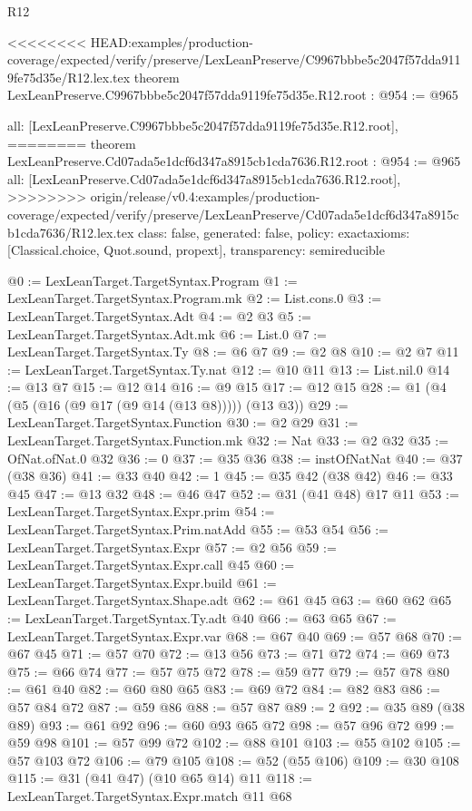 \begin{lexlean}{R12}
\begin{coremodule}
{{{{{{{{}
<<<<<<<< HEAD:examples/production-coverage/expected/verify/preserve/LexLeanPreserve/C9967bbbe5c2047f57dda9119fe75d35e/R12.lex.tex
theorem LexLeanPreserve.C9967bbbe5c2047f57dda9119fe75d35e.R12.root : @954 := @965 {
  all: [LexLeanPreserve.C9967bbbe5c2047f57dda9119fe75d35e.R12.root],
========
theorem LexLeanPreserve.Cd07ada5e1dcf6d347a8915cb1cda7636.R12.root : @954 := @965 {
  all: [LexLeanPreserve.Cd07ada5e1dcf6d347a8915cb1cda7636.R12.root],
>>>>>>>> origin/release/v0.4:examples/production-coverage/expected/verify/preserve/LexLeanPreserve/Cd07ada5e1dcf6d347a8915cb1cda7636/R12.lex.tex
  class: false,
  generated: false,
  policy: exact{axioms: [Classical.choice, Quot.sound, propext]},
  transparency: semireducible
}

@0 := LexLeanTarget.TargetSyntax.Program
@1 := LexLeanTarget.TargetSyntax.Program.mk
@2 := List.cons.{0}
@3 := LexLeanTarget.TargetSyntax.Adt
@4 := @2 @3
@5 := LexLeanTarget.TargetSyntax.Adt.mk
@6 := List.{0}
@7 := LexLeanTarget.TargetSyntax.Ty
@8 := @6 @7
@9 := @2 @8
@10 := @2 @7
@11 := LexLeanTarget.TargetSyntax.Ty.nat
@12 := @10 @11
@13 := List.nil.{0}
@14 := @13 @7
@15 := @12 @14
@16 := @9 @15
@17 := @12 @15
@28 := @1 (@4 (@5 (@16 (@9 @17 (@9 @14 (@13 @8))))) (@13 @3))
@29 := LexLeanTarget.TargetSyntax.Function
@30 := @2 @29
@31 := LexLeanTarget.TargetSyntax.Function.mk
@32 := Nat
@33 := @2 @32
@35 := OfNat.ofNat.{0} @32
@36 := 0
@37 := @35 @36
@38 := instOfNatNat
@40 := @37 (@38 @36)
@41 := @33 @40
@42 := 1
@45 := @35 @42 (@38 @42)
@46 := @33 @45
@47 := @13 @32
@48 := @46 @47
@52 := @31 (@41 @48) @17 @11
@53 := LexLeanTarget.TargetSyntax.Expr.prim
@54 := LexLeanTarget.TargetSyntax.Prim.natAdd
@55 := @53 @54
@56 := LexLeanTarget.TargetSyntax.Expr
@57 := @2 @56
@59 := LexLeanTarget.TargetSyntax.Expr.call @45
@60 := LexLeanTarget.TargetSyntax.Expr.build
@61 := LexLeanTarget.TargetSyntax.Shape.adt
@62 := @61 @45
@63 := @60 @62
@65 := LexLeanTarget.TargetSyntax.Ty.adt @40
@66 := @63 @65
@67 := LexLeanTarget.TargetSyntax.Expr.var
@68 := @67 @40
@69 := @57 @68
@70 := @67 @45
@71 := @57 @70
@72 := @13 @56
@73 := @71 @72
@74 := @69 @73
@75 := @66 @74
@77 := @57 @75 @72
@78 := @59 @77
@79 := @57 @78
@80 := @61 @40
@82 := @60 @80 @65
@83 := @69 @72
@84 := @82 @83
@86 := @57 @84 @72
@87 := @59 @86
@88 := @57 @87
@89 := 2
@92 := @35 @89 (@38 @89)
@93 := @61 @92
@96 := @60 @93 @65 @72
@98 := @57 @96 @72
@99 := @59 @98
@101 := @57 @99 @72
@102 := @88 @101
@103 := @55 @102
@105 := @57 @103 @72
@106 := @79 @105
@108 := @52 (@55 @106)
@109 := @30 @108
@115 := @31 (@41 @47) (@10 @65 @14) @11
@118 := LexLeanTarget.TargetSyntax.Expr.match @11 @68
}}}}}}}}
\end{coremodule}
\end{lexlean}
